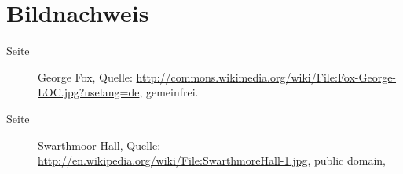 \chapter{Bildnachweis}

\begin{description}
 \item[Seite \pageref{bild:gfox}] George Fox, Quelle: \url{http://commons.wikimedia.org/wiki/File:Fox-George-LOC.jpg?uselang=de}, gemeinfrei.
 \item[Seite \pageref{bild:swarthmoor}] Swarthmoor Hall, Quelle: \url{http://en.wikipedia.org/wiki/File:SwarthmoreHall-1.jpg}, public domain,  

\end{description}